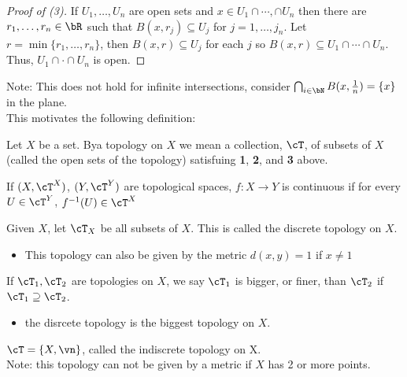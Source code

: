 \begin{proof}[Proof of (3)]
    If $U_1, \ldots, U_n$ are open sets and $x \in U_1 \cap \cdots, \cap U_n$ then there are $r_1, \ldots, r_n \in \bR$ such that $B(x, r_j) \subseteq U_j$ for $j=1, \ldots, j_n$. Let $r = \min \{ r_1, \ldots, r_n \}$, then $B(x, r) \subseteq U_j$ for each $j$ so $B(x,r)\subseteq U_1 \cap \cdots \cap U_n$. Thus, $U_1 \cap \cdot \cap U_n$ is open. 
\end{proof}

\noindent
Note: This does not hold for infinite intersections, consider $\bigcap_{i \in \bN} B(x, \frac{1}{n}) = \{x\}$ in the plane. \\

\noindent
This motivates the following definition: 
\begin{definition}
    Let $X$ be a set. Bya  topology on $X$ we mean a collection, $\cT$, of subsets of $X$ (called the open sets of the topology) satisfuing \textbf{1}, \textbf{2}, and \textbf{3} above. 
\end{definition}

\begin{definition}
    If $(X, \cT^X)$, $(Y, \cT^Y)$ are topological spaces, $f: X \to Y$ is continuous if for every $U \in \cT^Y$, $f^{-1}(U) \in \cT^X$
\end{definition}

\begin{example}
    Given $X$, let $\cT_X$ be all subsets of $X$. This is called the discrete topology on $X$. 
    \begin{itemize}
        \item This topology can also be given by the metric $d(x,y)=1$ if $x \neq 1$
    \end{itemize}
\end{example}

\begin{definition}
    If $\cT_1, \cT_2$ are topologies on $X$, we say $\cT_1$ is bigger, or finer, than $\cT_2$ if $\cT_1 \supseteq \cT_2$.
\end{definition}

\begin{itemize}
    \item the disrcete topology is the biggest topology on $X$.
\end{itemize}

\begin{example}
    $\cT = \{X, \vn\}$, called the indiscrete topology on X. \\
    Note: this topology can not be given by a metric if $X$ has 2 or more points. 
\end{example}